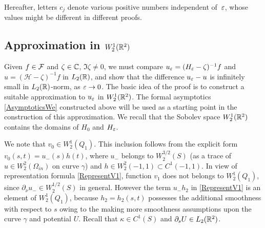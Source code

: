 Hereafter, letters $c_j$ denote various posi\-ti\-ve numbers independent of~$\varepsilon$, whose values might be different in different proofs.




\subsection{Approximation in $W_2^1(\mathbb R^2)$}

Given $f\in \mathcal{F}$ and $\zeta\in \mathbb C$, $\Im \zeta \neq 0$, we must compare $u_\varepsilon=(H_\varepsilon-\zeta)^{-1}f$ and $u=(\mathcal{H}-\zeta)^{-1}f$ in $L_2(\mathbb R)$, and show that the difference $u_\varepsilon-u$ is infinitely small in $L_2(\mathbb R)$-norm, as $\varepsilon\to 0$.
The basic idea of the proof is to construct a suitable approximation to $u_\varepsilon$ in  $W_2^1(\mathbb R^2)$.
The formal asymptotics \eqref{AsymptoticsWe} constructed above  will be used as a starting point in the construction of this approximation.
We recall that the Sobolev space $W_2^1(\mathbb R^2)$ contains the domains
of $H_0$ and $H_\varepsilon$.


We note that $v_0\in W_2^1(Q_1)$. This inclusion follows from the explicit form $v_0(s,t)=u_-(s)h(t)$, where  $u_-$ belongs to
$W_2^{3/2}(S)$ (as a trace of $u\in W_2^2(\Omega_{in})$  on curve  $\gamma$) and $h\in W_2^2(-1,1)\subset C^1(-1,1)$.
In view of representation formula \eqref{RepresentV1}, function $v_1$ does not belongs to $W_2^1(Q_1)$, since $\partial_\nu u_-\in W_2^{1/2}(S)$ in general.  However the term $u_- h_2$ in \eqref{RepresentV1} is an element of $W_2^1(Q_1)$, because $h_2=h_2(s,t)$ possesses the additional smoothness with respect to $s$ owing to the making more smoothness assumptions upon the curve $\gamma$ and potential $U$. Recall that $\kappa\in C^1(S)$ and $\partial_s U\in L_2(\mathbb R^2)$.

